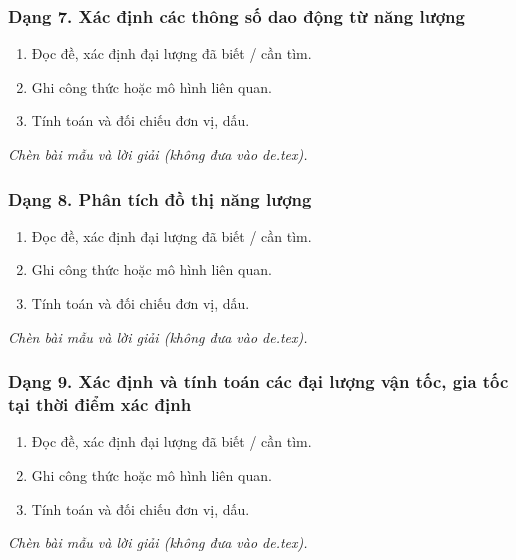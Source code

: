 \subsubsection{Dạng 7. Xác định các thông số dao động từ năng lượng}
\begin{phuongphap}
\begin{enumerate}
\item Đọc đề, xác định đại lượng đã biết / cần tìm.
\item Ghi công thức hoặc mô hình liên quan.
\item Tính toán và đối chiếu đơn vị, dấu.
\end{enumerate}
\end{phuongphap}
\begin{vidumau}
\textit{Chèn bài mẫu và lời giải (không đưa vào de.tex).}
\end{vidumau}

\subsubsection{Dạng 8. Phân tích đồ thị năng lượng}
\begin{phuongphap}
\begin{enumerate}
\item Đọc đề, xác định đại lượng đã biết / cần tìm.
\item Ghi công thức hoặc mô hình liên quan.
\item Tính toán và đối chiếu đơn vị, dấu.
\end{enumerate}
\end{phuongphap}
\begin{vidumau}
\textit{Chèn bài mẫu và lời giải (không đưa vào de.tex).}
\end{vidumau}

\subsubsection{Dạng 9. Xác định và tính toán các đại lượng vận tốc, gia tốc tại thời điểm xác định}
\begin{phuongphap}
\begin{enumerate}
\item Đọc đề, xác định đại lượng đã biết / cần tìm.
\item Ghi công thức hoặc mô hình liên quan.
\item Tính toán và đối chiếu đơn vị, dấu.
\end{enumerate}
\end{phuongphap}
\begin{vidumau}
\textit{Chèn bài mẫu và lời giải (không đưa vào de.tex).}
\end{vidumau}

